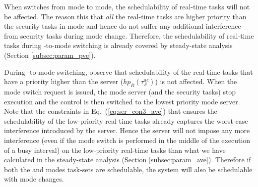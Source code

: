 \documentclass[../rt_server_main.tex]{subfiles}
\begin{document}
 
When \coolname switches from \pve mode to \ave mode, the schedulability of real-time tasks will not be affected. The reason this that \textit{all} the real-time tasks are higher priority than the security tasks in \pve mode and hence do not suffer any additional interference from security tasks during mode change. Therefore, the schedulability of real-time tasks during \pve-to-\ave mode switching is already covered by steady-state analysis (Section \ref{subsec:param_pve}).
 


During \ave-to-\pve mode switching, observe that schedulability of the real-time tasks that have a priority higher than the  server (\ie $hp_R(\tau_\mathcal{S}^{ac})$) is not affected. When the mode switch request is issued, the \ave mode server (and the security tasks) stop execution and the control is then switched to the lowest priority \pve mode server.
Note that the constraints in Eq.~(\ref{eq:ser_con3_ave}) that ensures the schedulability of the low-priority real-time tasks already captures the worst-case interference introduced by the server. Hence the server will not impose any more interference (even if the mode switch is performed in the middle of the execution of a
busy interval) on the low-priority real-time tasks than what we have calculated in the steady-state analysis (Section \ref{subsec:param_ave}). Therefore if both the \pve and \ave modes task-sets are schedulable, the system will also be schedulable with mode changes.
\end{document}
